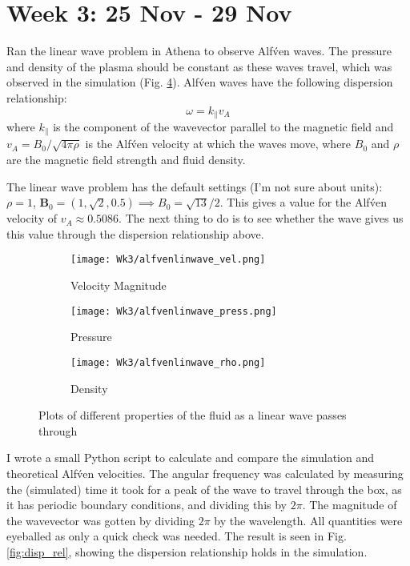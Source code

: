 \documentclass[12pt,letterpaper]{article}
\newcommand{\B}[1]{\mathbf{#1}}
\begin{document}
  \newpage
  \section*{Week 3: 25 Nov - 29 Nov}

  Ran the linear wave problem in Athena to observe Alf\'ven waves. The pressure and density of the plasma should be constant as these waves travel, which was observed in the simulation (Fig. \ref{fig:linwave}). Alf\'ven waves have the following dispersion relationship:
  $$
    \omega = k_\| v_A
  $$
  where $k_\|$ is the component of the wavevector parallel to the magnetic field and $v_A = B_0 / \sqrt{4\pi \rho}$ is the Alf\'ven velocity at which the waves move, where $B_0$ and $\rho$ are the magnetic field strength and fluid density.

  The linear wave problem has the default settings (I'm not sure about units): $\rho = 1$, $\B{B}_0=(1,\sqrt{2}, 0.5) \implies B_0 = \sqrt{13}/2$. This gives a value for the Alf\'ven velocity of $v_A \approx 0.5086$. The next thing to do is to see whether the wave gives us this value through the dispersion relationship above.

  \begin{figure}[!h]
   \centering
  \begin{subfigure}{0.3\textwidth}
  \texttt{[image: Wk3/alfvenlinwave\_vel.png]}
  \caption{Velocity Magnitude}
  \label{fig:linwave_vel}
  \end{subfigure}
  \begin{subfigure}{0.3\textwidth}
  \texttt{[image: Wk3/alfvenlinwave\_press.png]}
  \caption{Pressure}
  \label{fig:linwave_press}
  \end{subfigure}
  \begin{subfigure}{0.3\textwidth}
  \texttt{[image: Wk3/alfvenlinwave\_rho.png]}
  \caption{Density}
  \label{fig:linwave_rho}
  \end{subfigure}

  \caption{Plots of different properties of the fluid as a linear wave passes through}
  \label{fig:linwave}
  \end{figure}

  I wrote a small Python script to calculate and compare the simulation and theoretical Alf\'ven velocities.
  The angular frequency was calculated by measuring the (simulated) time it took for a peak of the wave to travel through the box, as it has periodic boundary conditions, and dividing this by $2\pi$. The magnitude of the wavevector was gotten by dividing $2\pi$ by the wavelength. All quantities were eyeballed as only a quick check was needed. The result is seen in Fig. \ref{fig:disp_rel}, showing the dispersion relationship holds in the simulation.
\end{document}
